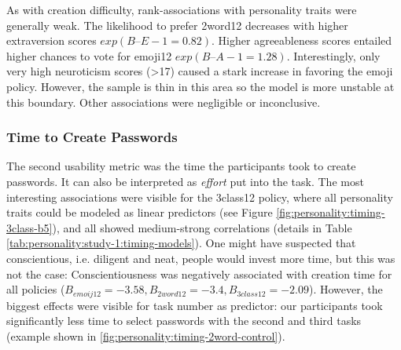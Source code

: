 As with creation difficulty, rank-associations with personality traits were generally weak. The likelihood to prefer 2word12 decreases with higher extraversion scores $exp(B–{E-1}=0.82)$. Higher agreeableness scores entailed higher chances to vote for emoji12 $exp(B–{A-1}=1.28)$. Interestingly, only very high neuroticism scores (>17) caused a  stark increase in favoring the emoji policy. However, the sample is thin in this area so the model is more unstable at this boundary. Other associations were negligible or inconclusive. 




\subsubsection{Time to Create Passwords}
The second usability metric was the time the participants took to create passwords. It can also be interpreted as \textit{effort} put into the task. The most interesting associations were visible for the 3class12 policy, where all personality traits could be modeled as linear predictors (see Figure \ref{fig:personality:timing-3class-b5}), and all showed medium-strong correlations (details in Table \ref{tab:personality:study-1:timing-models}). One might have suspected that conscientious, i.e. diligent and neat, people would invest more time, but this was not the case: Conscientiousness was negatively associated with creation time for all policies ($B_{emoij12}=-3.58,B_{2word12}=-3.4,B_{3class12}=-2.09$). However, the biggest effects were visible for task number as predictor: our participants took significantly less time to select passwords with the second and third tasks (example shown in \ref{fig:personality:timing-2word-control}). 


